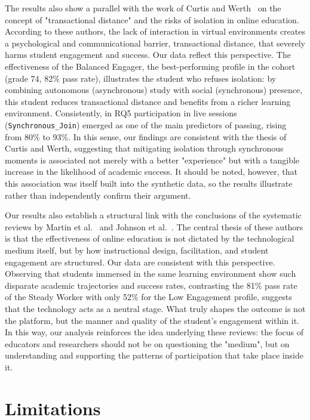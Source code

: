 The results also show a parallel with the work of Curtis and Werth~\cite{fostering_curtis_2015} on the concept of "transactional distance" and the risks of isolation in online education. According to these authors, the lack of interaction in virtual environments creates a psychological and communicational barrier, transactional distance, that severely harms student engagement and success. Our data reflect this perspective. The effectiveness of the Balanced Engager, the best-performing profile in the cohort (grade 74, 82\% pass rate), illustrates the student who refuses isolation: by combining autonomous (asynchronous) study with social (synchronous) presence, this student reduces transactional distance and benefits from a richer learning environment. Consistently, in RQ5 participation in live sessions (\texttt{Synchronous\_Join}) emerged as one of the main predictors of passing, rising from 80\% to 93\%. In this sense, our findings are consistent with the thesis of Curtis and Werth, suggesting that mitigating isolation through synchronous moments is associated not merely with a better "experience" but with a tangible increase in the likelihood of academic success. It should be noted, however, that this association was itself built into the synthetic data, so the results illustrate rather than independently confirm their argument.

Our results also establish a structural link with the conclusions of the systematic reviews by Martin et al.~\cite{martin_systematic_2020} and Johnson et al.~\cite{online_johnson_2022}. The central thesis of these authors is that the effectiveness of online education is not dictated by the technological medium itself, but by how instructional design, facilitation, and student engagement are structured. Our data are consistent with this perspective. Observing that students immersed in the same learning environment show such disparate academic trajectories and success rates, contrasting the 81\% pass rate of the Steady Worker with only 52\% for the Low Engagement profile, suggests that the technology acts as a neutral stage. What truly shapes the outcome is not the platform, but the manner and quality of the student's engagement within it. In this way, our analysis reinforces the idea underlying these reviews: the focus of educators and researchers should not be on questioning the "medium", but on understanding and supporting the patterns of participation that take place inside it.

\section{Limitations}
\label{sec:limitations}

